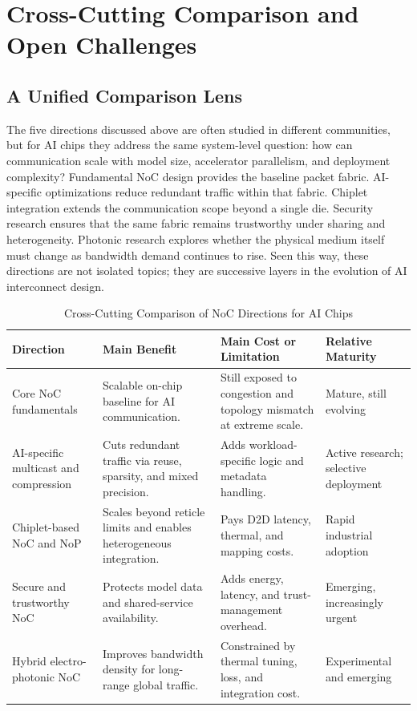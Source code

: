 \section{Cross-Cutting Comparison and Open Challenges}
\label{sec:crosscut}

\subsection{A Unified Comparison Lens}

The five directions discussed above are often studied in different communities, but for AI chips they address the same system-level question: how can communication scale with model size, accelerator parallelism, and deployment complexity? Fundamental NoC design provides the baseline packet fabric. AI-specific optimizations reduce redundant traffic within that fabric. Chiplet integration extends the communication scope beyond a single die. Security research ensures that the same fabric remains trustworthy under sharing and heterogeneity. Photonic research explores whether the physical medium itself must change as bandwidth demand continues to rise. Seen this way, these directions are not isolated topics; they are successive layers in the evolution of AI interconnect design.

\begin{table}[!t]
\caption{Cross-Cutting Comparison of NoC Directions for AI Chips}
\label{tab:crosscut}
\centering
\footnotesize
\setlength{\tabcolsep}{4pt}
\renewcommand{\arraystretch}{1.08}
\begin{tabularx}{\textwidth}{p{2.55cm}Y Y p{2.0cm}}
\toprule
Direction & Main Benefit & Main Cost or Limitation & Relative Maturity \\
\midrule
Core NoC fundamentals & Scalable on-chip baseline for AI communication. & Still exposed to congestion and topology mismatch at extreme scale. & Mature, still evolving \\
AI-specific multicast and compression & Cuts redundant traffic via reuse, sparsity, and mixed precision. & Adds workload-specific logic and metadata handling. & Active research; selective deployment \\
Chiplet-based NoC and NoP & Scales beyond reticle limits and enables heterogeneous integration. & Pays D2D latency, thermal, and mapping costs. & Rapid industrial adoption \\
Secure and trustworthy NoC & Protects model data and shared-service availability. & Adds energy, latency, and trust-management overhead. & Emerging, increasingly urgent \\
Hybrid electro-photonic NoC & Improves bandwidth density for long-range global traffic. & Constrained by thermal tuning, loss, and integration cost. & Experimental and emerging \\
\bottomrule
\end{tabularx}
\end{table}

